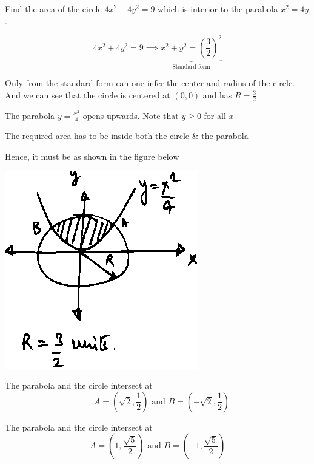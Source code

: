 \documentclass[14pt,fleqn]{extarticle}
\begin{document}
\newcommand\ysq{\left(\frac{9}{4}-x^2 \right)}
\newcommand\xsq{\left(\frac{3}{2} \right)^2 - y^2}

\newcommand\intg{2\int_{0}^{\sqrt{2}}}
Find the area of the circle $4x^2+4y^2=9$ 
which is interior to the parabola $x^2=4y$.
%

\newcard

\[ 4x^2 + 4y^2 = 9 \implies \underbrace{x^2 + y^2 = \left(\frac{3}{2} \right)^2}_{\text{Standard form}} \]

Only from the standard form can one infer the center and radius of the circle. And we can see that the circle is centered at $(0,0)$ and has $R = \frac{3}{2}$ \newline 

The parabola $y = \frac{x^2}{4}$ opens upwards. Note that $ y\geq 0$ for all $x$ \newline 

The required area has to be \underline{inside both}  the circle \& the parabola\newline 

Hence, it must be as shown in the figure below 

\begin{center}
\includegraphics[scale=1.3]{circ.eps} 
\end{center} 

\newcard 

The parabola and the circle intersect at 
\[ \quad  A =\left(\sqrt{2},\frac{1}{2} \right) \text{ and }B = \left( -\sqrt{2},\frac{1}{2}\right) \]

\newcard 

The parabola and the circle intersect at 
\[ A = \left( 1,\frac{\sqrt{5}}{2} \right) \text{ and } B = \left(-1,\frac{\sqrt{5}}{2} \right)  \]
\end{document}
